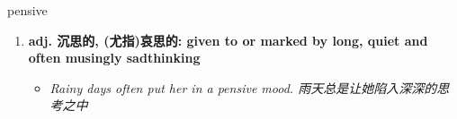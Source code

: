 
\begin{frame}
{\huge pensive}
\begin{center}
\begin{enumerate}\Large
  \item \textbf{adj. 沉思的, (尤指)哀思的: given to or marked by long, quiet and often musingly sadthinking}
  \begin{itemize}
    \item \em{\Large{Rainy days often put her in a pensive mood. 雨天总是让她陷入深深的思考之中}}
  \end{itemize}
\end{enumerate}
\end{center}
\end{frame}
